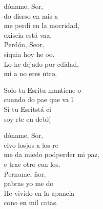 \begin{cancion}%
	dóname, Sor, \\
	do disrso en mis a \\
	me perdí en la mocridad,\\
	 exiscia está vaa. \\
	Perdón, Seor,\\
	 siquia hoy he oo. \\
	Lo he dejado por cdidad,\\
	 mi a no eres ntro.\jump\\
	\begin{chorus}%
		Solo tu Esritu  mantiene o \\
		cuando do pae que va l.\\
		Si tu Esritstá ci\\
		soy rte en debi(  \jump\\
	\end{chorus}%
	dóname, Sor, \\
	elvo losjos a los re \\
	me da miedo podperder mi paz,\\
	e trae otro con los.\\
	\jump
	Pername, ñor,\\
	 pabras yo me do \\
	He vivido en la apancia\\
	cono en mil catas.\\
\end{cancion}%

